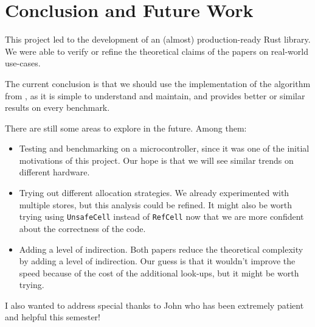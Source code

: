 \documentclass[12pt]{article}
\begin{document}
\newpage
\section{Conclusion and Future Work}

This project led to the development of an (almost) production-ready Rust library. We were able to verify or refine the theoretical claims of the papers on real-world use-cases.

The current conclusion is that we should use the implementation of the algorithm from \cite{10.5555/647912.740822}, as it is simple to understand and maintain, and provides better or similar results on every benchmark.

There are still some areas to explore in the future. Among them:
\begin{itemize}
    \item Testing and benchmarking on a microcontroller, since it was one of the initial motivations of this project. Our hope is that we will see similar trends on different hardware.
    \item Trying out different allocation strategies. We already experimented with multiple stores, but this analysis could be refined. It might also be worth trying using \texttt{UnsafeCell} instead of \texttt{RefCell} now that we are more confident about the correctness of the code.
    \item Adding a level of indirection. Both papers reduce the theoretical complexity by adding a level of indirection. Our guess is that it wouldn't improve the speed because of the cost of the additional look-ups, but it might be worth trying.
\end{itemize}

I also wanted to address special thanks to John who has been extremely patient and helpful this semester!

\newpage
\printbibliography
\end{document}

